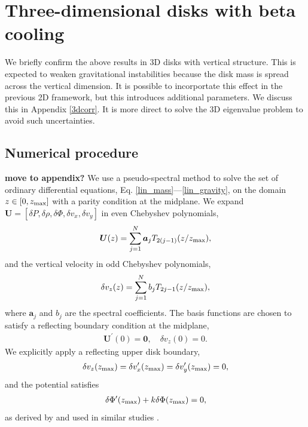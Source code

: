 \section{Three-dimensional disks with beta cooling}\label{3ddisk}
We briefly confirm the above results in 3D disks with vertical
structure. This is expected to weaken gravitational instabilities
because the disk mass is spread across the vertical dimension. It is
possible to incorportate this effect in the previous 2D framework, but this
introduces additional parameters. We discuss this in Appendix
\ref{3dcorr}. It is more direct to solve the 3D eigenvalue problem to
avoid such uncertainties. 


\subsection{Numerical procedure}
{\bf move to appendix?}
We use a pseudo-spectral method to solve the set of ordinary
differential equations, Eq. \ref{lin_mass}---\ref{lin_gravity}, on 
the domain $ z\in[0,z_\mathrm{max}]$ with a parity condition at the midplane.
We expand $\bm{U}=[\delta P,\delta\rho,\delta\Phi,
  \delta v_x, \delta 
  v_y]$ in even Chebyshev polynomials,
\begin{align}
  \bm{U}(z) = \sum_{j=1}^N \bm{a}_jT_{2(j-1)}(z/z_\mathrm{max}), 
\end{align}
and the vertical velocity in odd Chebyshev polynomials,
\begin{align}
  \delta v_z(z) = \sum_{j=1}^N b_jT_{2j-1}(z/z_\mathrm{max}),   
\end{align}
where $\bm{a}_j$ and $b_j$ are the spectral coefficients. 
The basis functions are chosen to satisfy a reflecting boundary
condition at the midplane, %
\begin{align}
  \bm{U}^\prime(0) = \bm{0}, \quad \delta v_z(0) = 0.
\end{align}
We explicitly apply a reflecting upper disk boundary, 
\begin{align}
  \delta v_z(z_\mathrm{max}) = \delta v_x^\prime(z_\mathrm{max}) = \delta
  v_y^\prime(z_\mathrm{max}) = 0,
\end{align}
and the potential satisfies
\begin{align}
  \delta \Phi^\prime (z_\mathrm{max}) + k \delta\Phi(z_\mathrm{max}) = 0, 
\end{align}
as derived by \cite{goldreich65a} and used in similar studies  
\citep{kim12,lin14c}. %

